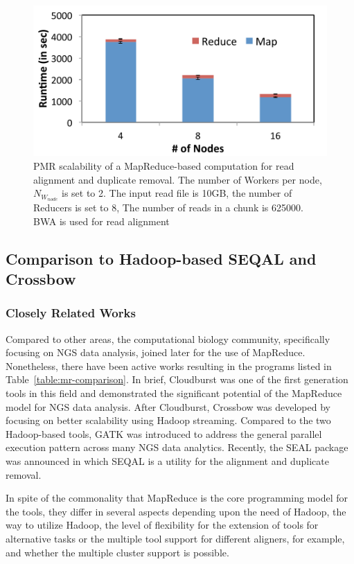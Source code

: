 \documentclass{acm_proc_article-sp}
\begin{document}
\begin{figure}
 \centering
\includegraphics[scale=0.50]{figures/pj-smr-scale.pdf}
\caption{\small PMR scalability of a MapReduce-based computation for read alignment and duplicate removal.  The number of Workers per node, $N_{W_{node}}$ is set to 2.   The input read file is 10GB, the number of Reducers is set to 8, The number of reads in a chunk is 625000. BWA is used for read alignment}
  \label{fig:scale-p-saga-mr} 
\end{figure}


\subsection{Comparison to Hadoop-based SEQAL and Crossbow}
\subsubsection{Closely Related Works}
Compared to other areas, the computational biology community, specifically focusing on NGS data analysis, joined later for the use of MapReduce\cite{cloudburst}.  Nonetheless, there have been active works resulting in the programs listed in Table~\ref{table:mr-comparison}.  In brief, Cloudburst was one of the first generation tools in this field and  demonstrated the significant potential of the MapReduce model for NGS data analysis.  After Cloudburst, Crossbow was developed by focusing on better scalability using Hadoop streaming.  Compared to the two Hadoop-based tools, GATK was introduced to address the general parallel execution pattern across many NGS data analytics.  Recently, the SEAL package was announced in which SEQAL is a utility for the alignment and duplicate removal.   

In spite of the commonality that MapReduce is the core programming model for the tools, they differ in several aspects depending upon the need of Hadoop, the way to utilize Hadoop, the level of flexibility for the extension of tools for alternative tasks or the multiple tool support for different aligners, for example, and whether the multiple cluster support is possible.
\end{document}
